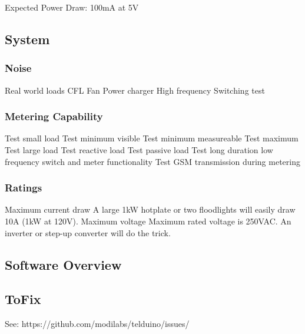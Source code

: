 \documentclass[]{article}
\begin{document}
            Expected Power Draw: 100mA at 5V

    \subsection{System}
    \subsubsection{Noise}
        Real world loads
        CFL
        Fan
        Power charger
        High frequency Switching test

    \subsubsection{Metering Capability}
        Test small load
        Test minimum visible
        Test minimum measureable
        Test maximum
        Test large load
        Test reactive load
        Test passive load
        Test long duration low frequency switch and meter functionality
        Test GSM transmission during metering
    \subsubsection{Ratings}
        Maximum current draw
            A large 1kW hotplate or two floodlights will easily draw 10A (1kW at 120V).
        Maximum voltage
            Maximum rated voltage is 250VAC. 
            An inverter or step-up converter will do the trick.
    \subsection{Software Overview}
    \subsection{ToFix}
        See: https://github.com/modilabs/telduino/issues/
\end{document}
